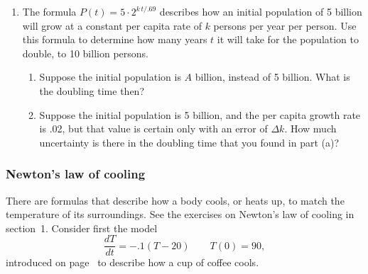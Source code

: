 \begin{enumerate}
\begin{enumerate}
\end{enumerate}
\item The formula $P(t) = 5\cdot 2^{k\,t/.69}$ describes how an initial population of 5 billion will grow at a constant per capita rate of $k$ persons per year per person.  Use this formula to determine how many years $t$ it will take for the population to double, to 10 billion persons.

  \begin{enumerate}
  \item Suppose the initial population is $A$ billion, instead of 5 billion.  What is the doubling time then?

  \item Suppose the initial population is 5 billion, and the per capita growth rate is .02, but that value is certain only with an error of $\Delta k$.  How much uncertainty is there in the doubling time that you found in part (a)?


\end{enumerate}
\end{enumerate}
\subsubsection{Newton's law of cooling}
\label{subsubsec:newtons-law-of-cooling}

There are formulas that describe how a body cools, or heats up, to
match the temperature of its surroundings.  See the exercises on
Newton's law of cooling in section~1.  Consider first the model
	\[
\dfrac{dT}{dt} = -.1(T - 20) \qquad T(0) = 90,
\]
introduced on page~\pageref{cooling coffee} to describe how a cup of
coffee cools.


